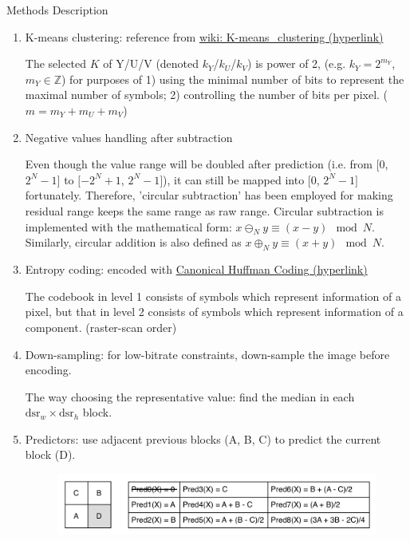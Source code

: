\documentclass[12pt]{article}
\makeatletter
\renewenvironment{itemize}
{\list{$\bullet$}{\leftmargin\z@ \labelwidth\z@ \itemindent-\leftmargin
\let\makelabel\descriptionlabel}}
{\endlist}
\makeatother
\begin{document}
\begin{itemize}
	\item Methods Description
		\begin{enumerate}
			\item K-means clustering: reference from \href{https://en.wikipedia.org/wiki/K-means_clustering}{wiki: K-means\_clustering (hyperlink)}
				\begin{flushleft}
					The selected $K$ of Y/U/V (denoted $k_Y$/$k_U$/$k_V$) is power of 2, (e.g. $k_Y = 2^{m_Y}$, $m_Y \in \mathbb{Z}$) for purposes of 1) using the minimal number of bits to represent the maximal number of symbols; 2) controlling the number of bits per pixel. ($m = m_Y+m_U+m_V$)
				\end{flushleft}
			\item Negative values handling after subtraction
				\begin{flushleft}
					Even though the value range will be doubled after prediction (i.e. from $[0$, $2^N-1]$ to $[-2^N+1$, $2^N-1]$), it can still be mapped into $[0$, $2^N-1]$ fortunately. Therefore, 'circular subtraction' has been employed for making residual range keeps the same range as raw range. Circular subtraction is implemented with the mathematical form: $x \ominus_N y \equiv (x-y) \mod N$. \\
					Similarly, circular addition is also defined as $x \oplus_N y \equiv (x+y) \mod N$.
				\end{flushleft}
			\item Entropy coding: encoded with \href{https://en.wikipedia.org/wiki/Canonical_Huffman_code}{Canonical Huffman Coding (hyperlink)}
				\begin{flushleft}
					The codebook in level 1 consists of symbols which represent information of a pixel, but that in level 2 consists of symbols which represent information of a component. (raster-scan order)
				\end{flushleft}
			\item Down-sampling: for low-bitrate constraints, down-sample the image before encoding.
				\begin{flushleft}
					The way choosing the representative value: find the median in each $\text{dsr}_w \times \text{dsr}_h$ block.
				\end{flushleft}
			\item Predictors: use adjacent previous blocks (A, B, C) to predict the current block (D).
				\begin{figure}[ht]
					\centering
					\includegraphics[scale=.4]{./res/predictors.png}
					\vspace*{-2.5em}
				\end{figure}
		\end{enumerate}
\end{itemize}
\end{document}
